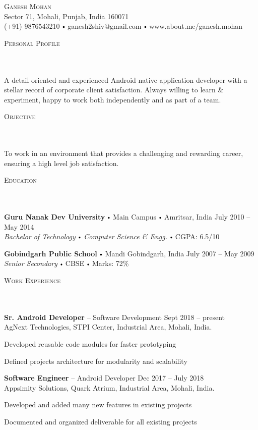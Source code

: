 \documentclass{article}
\newcommand{\contact}[3]{
\vspace*{5pt}
\begin{center}
{\LARGE \scshape {#1}}\\
\vspace{3pt}
#2 
\vspace{2pt}
#3
\end{center}
\vspace*{-8pt}
}
\newcommand{\header}[1]{{
\hspace*{-15pt}\vspace*{6pt} \textsc{#1}} \vspace*{-6pt} 
\lineunder
}
\newcommand{\lineunder}{
\vspace*{-8pt} \\ \hspace*{-18pt} 
\hrulefill \\
}
\newcommand{\content}{
\vspace*{2pt}%
}
\newcommand{\college}[5]{\vspace*{2pt}%
\textbf{#1} \labelitemi #2 \labelitemi #3 \hfill #4 \\ #5 
\vspace*{5pt}
}
\newcommand{\school}[4]{
\textbf{#1} \labelitemi #2 \hfill #3 \\ #4 \vspace*{5pt}
}
\newcommand{\employer}[4]{{
\vspace*{2pt}%
\textbf{#1} #2 \hfill #3\\ #4 \vspace*{2pt}}
}
\renewcommand{\labelitemi}{
$\vcenter{\hbox{\tiny$\bullet$}}$\hspace*{3pt}
}
\renewcommand{\labelitemii}{
$\vcenter{\hbox{\tiny$\bullet$}}$\hspace*{-3pt}
}
\newenvironment{bullet-list-minor}{
\begin{list}{\labelitemii}{\setlength\leftmargin{15pt} 
\topsep 0pt \itemsep -2pt}}{\vspace*{4pt}\end{list}
}
\begin{document}
\small
\smallskip
\vspace*{-44pt}

\contact{Ganesh Mohan}
{Sector 71, Mohali, Punjab, India 160071\\}
{(+91) 9876543210 \labelitemi ganesh2shiv@gmail.com \labelitemi www.about.me/ganesh.mohan}
\vspace{15pt}
\header{Personal Profile}
    \content{A detail oriented and experienced Android native application developer with a stellar record of corporate client satisfaction. Always willing to learn \& experiment, happy to work both independently and as part of a team.\vspace{5pt}}

\vspace*{4pt}%
\header{Objective}
    \content{To work in an environment that provides a challenging and rewarding career, ensuring a high level job satisfaction.\vspace{5pt}}

\vspace*{4pt}%
\header{Education}
    \college{Guru Nanak Dev University}{Main Campus}{Amritsar, India}{July 2010 -- May 2014}
    {\textit{Bachelor of Technology \labelitemi Computer Science \& Engg.}\labelitemi CGPA: 6.5/10}

    \school{Gobindgarh Public School}{Mandi Gobindgarh, India}{July 2007 -- May 2009}
    {\textit{Senior Secondary} \labelitemi CBSE \labelitemi Marks: 72\%}

\vspace*{4pt}%
\header{Work Experience}
    \employer{Sr. Android Developer}{-- Software Development}{Sept 2018 -- present}{AgNext Technologies, STPI Center, Industrial Area, Mohali, India.}
	\begin{bullet-list-minor}
	\item Developed reusable code modules for faster prototyping
	\item Defined projects architecture for modularity and scalability
    \end{bullet-list-minor}

    \employer{Software Engineer}{-- Android Developer}{Dec 2017 -- July 2018}{Appsimity Solutions, Quark Atrium, Industrial Area, Mohali, India.}
	\begin{bullet-list-minor}
	\item Developed and added many new features in existing projects
	\item Documented and organized deliverable for all existing projects   
    \end{bullet-list-minor}
\end{document}
